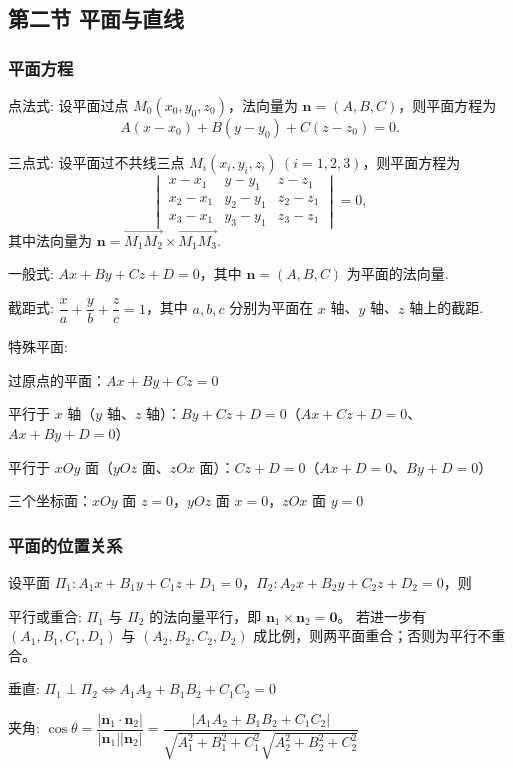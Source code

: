 \subsection{第二节 平面与直线}
\subsubsection{平面方程}
\begin{zs}
    点法式: 设平面过点 $M_0(x_0,y_0,z_0)$，法向量为 $\boldsymbol{n}=(A,B,C)$，则平面方程为  \[  A(x-x_0)+B(y-y_0)+C(z-z_0)=0.  \]
\end{zs}

\begin{zs}
    三点式: 设平面过不共线三点 $M_i(x_i,y_i,z_i)\ (i=1,2,3)$，则平面方程为
  \[
  \begin{vmatrix}
  x-x_1 & y-y_1 & z-z_1 \\
  x_2-x_1 & y_2-y_1 & z_2-z_1 \\
  x_3-x_1 & y_3-y_1 & z_3-z_1
  \end{vmatrix}=0,
  \]
  其中法向量为 $\boldsymbol{n} = \overrightarrow{M_1M_2} \times \overrightarrow{M_1M_3}$.
\end{zs}
\begin{zs}
    一般式: $Ax+By+Cz+D=0$，其中 $\boldsymbol{n}=(A,B,C)$ 为平面的法向量.
\end{zs}
\begin{zs}
    截距式: $\dfrac{x}{a}+\dfrac{y}{b}+\dfrac{z}{c}=1$，其中 $a,b,c$ 分别为平面在 $x$ 轴、$y$ 轴、$z$ 轴上的截距.
\end{zs}
\begin{zs}
    特殊平面:

  过原点的平面：$Ax+By+Cz=0$
  
  平行于 $x$ 轴（$y$ 轴、$z$ 轴）：$By+Cz+D=0$（$Ax+Cz+D=0$、$Ax+By+D=0$）
  
平行于 $xOy$ 面（$yOz$ 面、$zOx$ 面）：$Cz+D=0$（$Ax+D=0$、$By+D=0$）


 三个坐标面：$xOy$ 面 $z=0$，$yOz$ 面 $x=0$，$zOx$ 面 $y=0$

\end{zs}
\subsubsection{平面的位置关系}
 设平面 $\Pi_1: A_1x+B_1y+C_1z+D_1=0$，$\Pi_2: A_2x+B_2y+C_2z+D_2=0$，则
\begin{zs}
   平行或重合: $\Pi_1$ 与 $\Pi_2$ 的法向量平行，即 $\boldsymbol{n}_1\times \boldsymbol{n}_2=\boldsymbol{0}$。
   若进一步有 $(A_1,B_1,C_1,D_1)$ 与 $(A_2,B_2,C_2,D_2)$ 成比例，则两平面重合；否则为平行不重合。
\end{zs}
\begin{zs}
    垂直: $\Pi_1 \perp \Pi_2 \Leftrightarrow A_1A_2+B_1B_2+C_1C_2=0$
\end{zs}
\begin{zs}
    夹角: $\cos\theta=\dfrac{|\boldsymbol{n}_1\cdot\boldsymbol{n}_2|}{|\boldsymbol{n}_1||\boldsymbol{n}_2|}=\dfrac{|A_1A_2+B_1B_2+C_1C_2|}{\sqrt{A_1^2+B_1^2+C_1^2}\sqrt{A_2^2+B_2^2+C_2^2}}$
\end{zs}
